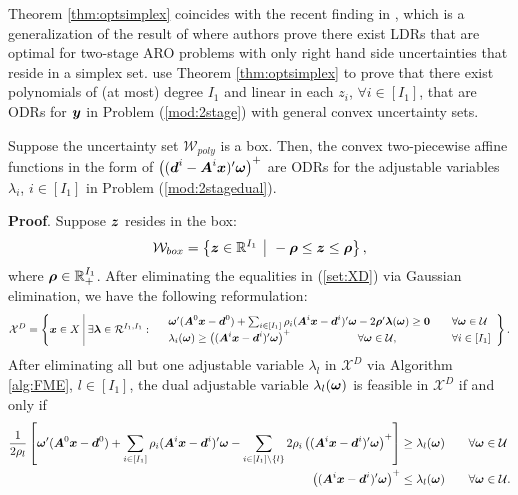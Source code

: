 \documentclass[fleqn,orsc,blindrev]{informs4}
\newcommand{\mb}[1]{\mbox{\boldmath \ensuremath{#1}}}
\begin{document}
	 {Theorem \ref{thm:optsimplex} coincides with the recent finding in \cite[Corollary 2]{bwoz16}}, which is a generalization of the result of \cite[Theorem 1]{bg12} where authors prove there exist  LDRs that are optimal for two-stage ARO problems with only right hand side uncertainties that reside in a simplex set.  {\cite{zd17b} use Theorem \ref{thm:optsimplex} to prove that there exist polynomials of (at most) degree $I_1$ and linear in each $z_i$, $\forall i \in [I_1]$, that are ODRs for $\mb{y}$ in Problem (\ref{mod:2stage}) with general convex uncertainty sets.}
	
	
	\begin{theorem} \label{thm:optbox}
		Suppose the uncertainty set $\mathcal{W}_{poly}$ is a box. Then, the convex two-piecewise affine functions in the form of $\left((\mb{d}^i- \mb{A}^i\mb{x})'\mb{\omega}\right)^+$ are ODRs for the adjustable variables $\lambda_i$, $i\in [I_1]$ in Problem (\ref{mod:2stagedual}).
	\end{theorem}
	\textbf{Proof}. Suppose $\mb{z}$ resides in the box:
\begin{equation*}
	\mathcal{W}_{box} = \left\{ \mb{z}\in \mathbb{R}^{I_1} \enskip \vline  \enskip -\mb{\rho} \le \mb{z} \le \mb{\rho} \right\},  
\end{equation*}
	where $\mb{\rho} \in \mathbb{R}^{I_1}_{+}$.  After eliminating the equalities in (\ref{set:XD}) via Gaussian elimination, we have the following reformulation:
\begin{equation}\label{set:Xbox}
		\mathcal{X}^D=  \left\{ \mb{x} \in X \,\, \vline \,\,
		\exists \mb{\lambda} \in \mathcal{R}^{I_1,I_1}: \begin{array}{lll}
			&  \mb{\omega}' (\mb{A}^0\mb{x}-\mb{d}^0) + \sum_{i\in [I_1]} \rho_i (\mb{A}^i\mb{x}-\mb{d}^i)'\mb{\omega}- 2\mb{\rho}'\mb{\lambda}(\mb{\omega}) \ge \mb{0}  \quad & \forall \mb{\omega} \in \mathcal{U} \\
			&\lambda_i(\mb{\omega}) \ge \left((\mb{A}^i\mb{x}- \mb{d}^i)'\mb{\omega}\right)^+   \qquad   \qquad  \qquad \forall \mb{\omega} \in \mathcal{U},  \enskip &\forall i\in [I_1] 
		\end{array}
		\right\}.
\end{equation}
	After eliminating all but one adjustable variable $\lambda_l$ in $\mathcal{X}^D$ via Algorithm \ref{alg:FME}, $l \in [I_1]$,  the dual adjustable variable $\lambda_l(\mb{\omega})$ is feasible in $\mathcal{X}^D$ if and only if 
\begin{align*}
		 \frac{1}{2\rho_l} \left[\mb{\omega}' (\mb{A}^0\mb{x}-\mb{d}^0) + \sum_{i\in [I_1]} \rho_i (\mb{A}^i\mb{x}-\mb{d}^i )'\mb{\omega} - \sum_{i \in [I_1]\setminus\{l\}}  2\rho_i\left((\mb{A}^i\mb{x}- \mb{d}^i)'\mb{\omega}\right)^+ \right] &\ge  \lambda_l(\mb{\omega}) \qquad  \forall \mb{\omega} \in \mathcal{U}\\
		   \left((\mb{A}^i\mb{x}- \mb{d}^i)'\mb{\omega}\right)^+ &\le \lambda_l(\mb{\omega}) \qquad  \forall \mb{\omega} \in \mathcal{U}.
\end{align*}
\end{document}

